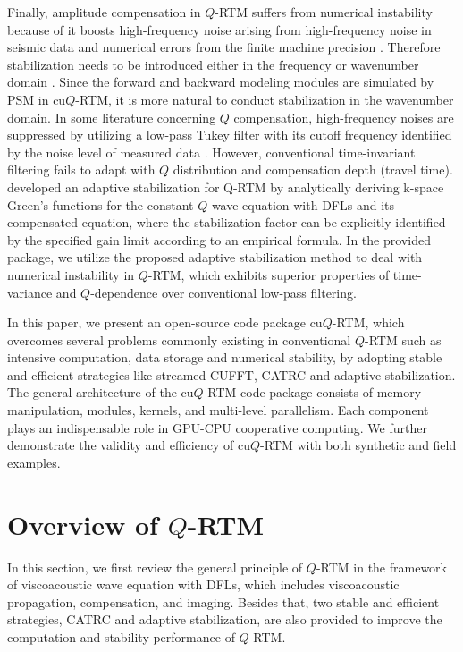 Finally, amplitude compensation in $Q$-RTM suffers from numerical instability because of it boosts high-frequency noise arising from high-frequency noise in seismic data and numerical errors from the finite machine precision \citep{wang2009seismic, Zhu2014Q, yang2016wavefield, zhao2017method}. Therefore stabilization needs to be introduced either in the frequency or wavenumber domain \citep{Kalimeris2012Photoacoustic, Ammari2013Time}. Since the forward and backward modeling modules are simulated by PSM in cu$Q$-RTM, it is more natural to conduct stabilization in the wavenumber domain. In some literature concerning $Q$ compensation, high-frequency noises are suppressed by utilizing a low-pass Tukey filter with its cutoff frequency identified by the noise level of measured data \citep{Treeby2010Photoacoustic, Zhu2014Q,Li2016Efficient}. However, conventional time-invariant filtering fails to adapt with $Q$ distribution and compensation depth (travel time). \cite{wang2018adaptive} developed an adaptive stabilization for Q-RTM by analytically deriving k-space Green's functions for the constant-$Q$ wave equation with DFLs and its compensated equation, where the stabilization factor can be explicitly identified by the specified gain limit according to an empirical formula. In the provided package, we utilize the proposed adaptive stabilization method to deal with numerical instability in $Q$-RTM, which exhibits superior properties of time-variance and $Q$-dependence over conventional low-pass filtering. 

In this paper, we present an open-source code package cu$Q$-RTM, which overcomes several problems commonly existing in conventional $Q$-RTM such as intensive computation, data storage and numerical stability, by adopting stable and efficient strategies like streamed CUFFT, CATRC and adaptive stabilization. The general architecture of the cu$Q$-RTM code package consists of memory manipulation, modules, kernels, and multi-level parallelism. Each component plays an indispensable role in GPU-CPU cooperative computing. We further demonstrate the validity and efficiency of cu$Q$-RTM with both synthetic and field examples. 

\section{Overview of $Q$-RTM}

In this section, we first review the general principle of $Q$-RTM in the framework of viscoacoustic wave equation with DFLs, which includes viscoacoustic propagation, compensation, and imaging. Besides that, two stable and efficient strategies, CATRC and adaptive stabilization, are also provided to improve the computation and stability performance of $Q$-RTM.

